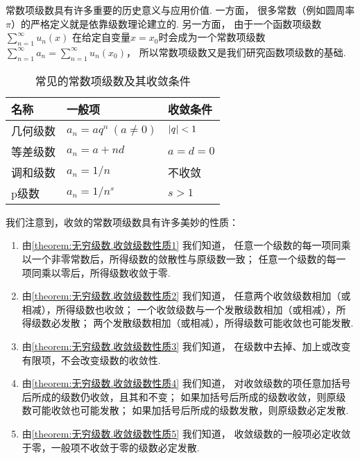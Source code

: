 常数项级数具有许多重要的历史意义与应用价值.
一方面，%
很多常数（例如圆周率\(\pi\)）的严格定义就是依靠级数理论建立的.
另一方面，%
由于一个函数项级数\(\sum\limits_{n=1}^\infty u_n(x)\)%
在给定自变量\(x=x_0\)时会成为一个常数项级数\(\sum\limits_{n=1}^\infty a_n
= \sum\limits_{n=1}^\infty u_n(x_0)\)，%
所以常数项级数又是我们研究函数项级数的基础.

\begin{table}[h]
	\centering
	\begin{tabular}{*3l}
		\hline
		名称 & 一般项 & 收敛条件 \\ \hline
		几何级数 & \(a_n = a q^n\ (a\neq0)\) & \(\abs{q}<1\) \\
		等差级数 & \(a_n = a + n d\) & \(a = d = 0\) \\
		调和级数 & \(a_n = 1/n\) & 不收敛 \\
		p级数 & \(a_n = 1/n^s\) & \(s > 1\) \\
		\hline
	\end{tabular}
	\caption{常见的常数项级数及其收敛条件}
\end{table}

我们注意到，收敛的常数项级数具有许多美妙的性质：
\begin{enumerate}
\item 由\cref{theorem:无穷级数.收敛级数性质1} 我们知道，%
任意一个级数的每一项同乘以一个非零常数后，所得级数的敛散性与原级数一致；
任意一个级数的每一项同乘以零后，所得级数收敛于零.

\item 由\cref{theorem:无穷级数.收敛级数性质2} 我们知道，%
任意两个收敛级数相加（或相减），所得级数也收敛；
一个收敛级数与一个发散级数相加（或相减），所得级数必发散；
两个发散级数相加（或相减），所得级数可能收敛也可能发散.

\item 由\cref{theorem:无穷级数.收敛级数性质3} 我们知道，%
在级数中去掉、加上或改变有限项，不会改变级数的收敛性.

\item 由\cref{theorem:无穷级数.收敛级数性质4} 我们知道，%
对收敛级数的项任意加括号后所成的级数仍收敛，且其和不变；
如果加括号后所成的级数收敛，则原级数可能收敛也可能发散；
如果加括号后所成的级数发散，则原级数必定发散.

\item 由\cref{theorem:无穷级数.收敛级数性质5} 我们知道，%
收敛级数的一般项必定收敛于零，一般项不收敛于零的级数必定发散.
\end{enumerate}

